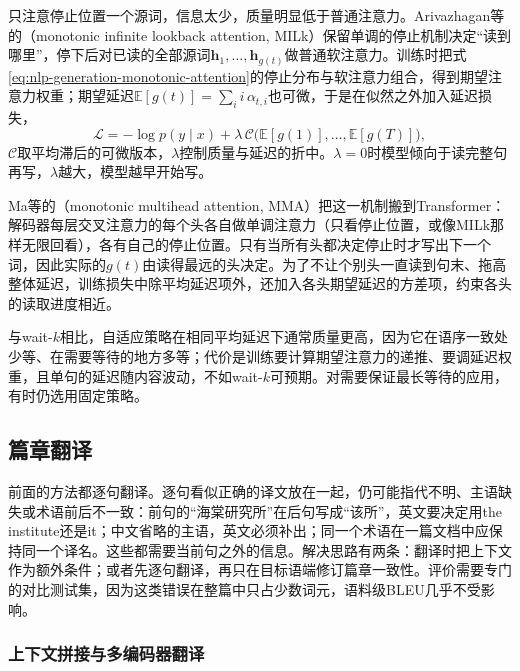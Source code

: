 只注意停止位置一个源词，信息太少，质量明显低于普通注意力。Arivazhagan等的（monotonic infinite lookback attention, MILk）保留单调的停止机制决定“读到哪里”，停下后对已读的全部源词$\bm h_1,\ldots,\bm h_{g(t)}$做普通软注意力。训练时把式\eqref{eq:nlp-generation-monotonic-attention}的停止分布与软注意力组合，得到期望注意力权重；期望延迟$\mathbb E[g(t)]=\sum_i i\,\alpha_{t,i}$也可微，于是在似然之外加入延迟损失，
\begin{equation}
  \mathcal L=-\log p(y\mid x)+\lambda\,\mathcal C\bigl(\mathbb E[g(1)],\ldots,\mathbb E[g(T)]\bigr),
  \label{eq:nlp-generation-milk-loss}
\end{equation}
$\mathcal C$取平均滞后的可微版本，$\lambda$控制质量与延迟的折中。$\lambda=0$时模型倾向于读完整句再写，$\lambda$越大，模型越早开始写。

Ma等的（monotonic multihead attention, MMA）把这一机制搬到Transformer\cite{nlp-gen-ma2020mma}：解码器每层交叉注意力的每个头各自做单调注意力（只看停止位置，或像MILk那样无限回看），各有自己的停止位置。只有当所有头都决定停止时才写出下一个词，因此实际的$g(t)$由读得最远的头决定。为了不让个别头一直读到句末、拖高整体延迟，训练损失中除平均延迟项外，还加入各头期望延迟的方差项，约束各头的读取进度相近。

与wait-$k$相比，自适应策略在相同平均延迟下通常质量更高，因为它在语序一致处少等、在需要等待的地方多等；代价是训练要计算期望注意力的递推、要调延迟权重，且单句的延迟随内容波动，不如wait-$k$可预期。对需要保证最长等待的应用，有时仍选用固定策略。

\subsection{篇章翻译}
\label{sec:nlp-generation-document-translation}

前面的方法都逐句翻译。逐句看似正确的译文放在一起，仍可能指代不明、主语缺失或术语前后不一致：前句的“海棠研究所”在后句写成“该所”，英文要决定用the institute还是it；中文省略的主语，英文必须补出；同一个术语在一篇文档中应保持同一个译名。这些都需要当前句之外的信息。解决思路有两条：翻译时把上下文作为额外条件；或者先逐句翻译，再只在目标语端修订篇章一致性。评价需要专门的对比测试集，因为这类错误在整篇中只占少数词元，语料级BLEU几乎不受影响。

\subsubsection{上下文拼接与多编码器翻译}
\label{sec:nlp-generation-context-translation}

